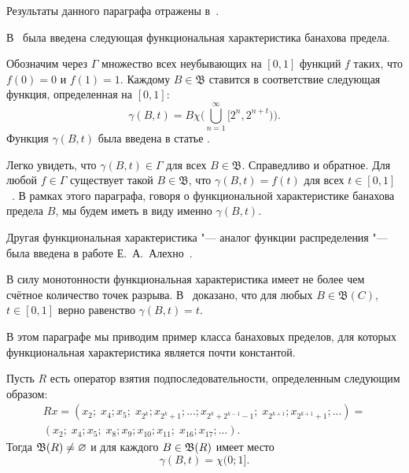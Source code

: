 Результаты данного параграфа отражены в~\cite{avdeev2024set_DAN_rus}.


В~\cite{semenov2019mainclasses_rus} была введена следующая функциональная характеристика банахова предела.

Обозначим через $\Gamma$ множество всех неубывающих на $[0, 1]$ функций $f$ таких,
что $f(0) = 0$ и $f(1) = 1$. Каждому $B \in \mathfrak B$
ставится в соответствие следующая функция, определенная на $[0, 1]$:
$$
        \gamma(B, t) = B \chi\Bigg(\bigcup^\infty_{n = 1} [2^n, 2^{n + t})\Bigg)
        .
$$
Функция $\gamma(B,t)$ была введена в статье \cite{semenov2019mainclasses_rus}.

Легко увидеть, что $\gamma (B, t) \in \Gamma$ для всех $B \in \mathfrak B$.
Справедливо и обратное. Для любой $f \in \Gamma$ существует такой
$B \in \mathfrak B$, что $\gamma(B, t) = f(t)$ для всех
$t \in [0, 1]$~\cite[Предложение 2]{semenov2019mainclasses_rus}.
В рамках этого параграфа, говоря о функциональной характеристике банахова предела $B$,
мы будем иметь в виду именно $\gamma(B,t)$.

Другая функциональная характеристика "--- аналог функции распределения "--- была введена в работе Е.~А.~Алехно~\cite{alekhno2015banach}.

В силу монотонности функциональная характеристика имеет не более чем счётное количество точек разрыва.
В~\cite[Теорема 23]{semenov2019mainclasses_rus} доказано, что
для любых $B \in \mathfrak B(C)$, $t \in [0, 1]$ верно равенство $\gamma (B, t) = t$.

В этом параграфе мы приводим пример класса банаховых пределов,
для которых функциональная характеристика является почти константой.

\begin{lemma}
    Пусть $R$ есть оператор взятия подпоследовательности, определенным следующим образом:
	\begin{multline}
		\label{eq:sprawling_R}
		Rx = (x_2; \; x_4; x_5; \; x_{2^k}; x_{2^k + 1}; ... ; x_{2^k + 2^{k-1} - 1}; \; x_{2^{k+1}}; x_{2^{k+1} + 1};...)
		=\\
		(x_2; \; x_4; x_5; \; x_8; x_9; x_{10}; x_{11}; \; x_{16}; x_{17}; ...)
		.
	\end{multline}
    Тогда $\mathfrak{B}(R) \ne\varnothing$ и для каждого $B\in \mathfrak{B}(R)$ имеет место
    \begin{equation}
        \gamma(B, t) = \chi(0;1]
        .
    \end{equation}
\end{lemma}


